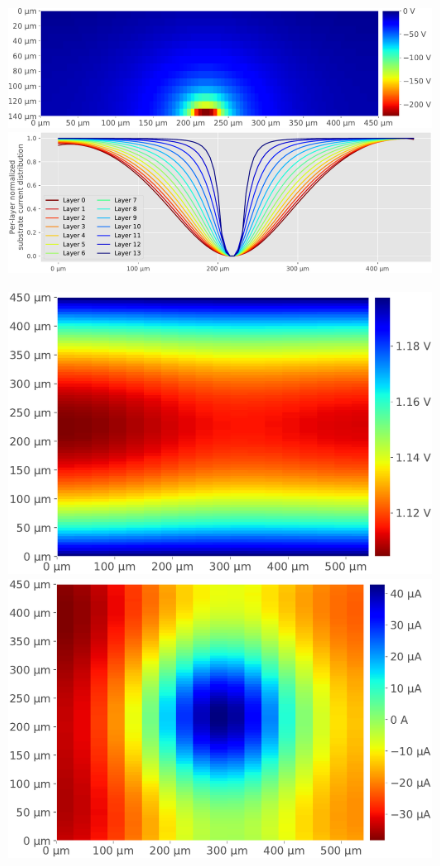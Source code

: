 \begin{figure}[hbtp]
\begin{minipage}{0.5\textwidth}
		\includegraphics[width=\textwidth]{./figures/modelesSimusResul/dualWell/vSubcManuscrit-cropped.pdf}
		\includegraphics[width=\textwidth]{./figures/modelesSimusResul/dualWell/CurrentDistributionNormT140eT10_ExcDw-cropped.pdf}
	\end{minipage}
	\begin{minipage}{0.5\textwidth}
		\includegraphics[width=\textwidth]{./figures/modelesSimusResul/tripleWell/vddMgndManuscritTw-cropped.pdf}
		\includegraphics[width=\textwidth]{./figures/modelesSimusResul/tripleWell/iEpiTripleWellManuscrit-cropped.pdf}

\end{minipage}
\end{figure}

